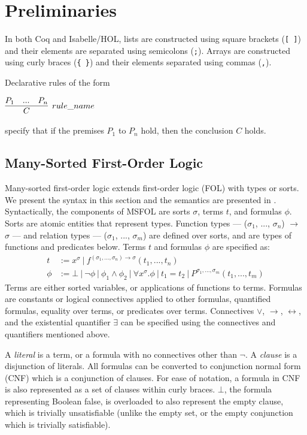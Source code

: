 \documentclass{article}
\begin{document}
	\section{Preliminaries}
	\label{sec:prelims}
	
	In both Coq and Isabelle/HOL,
	lists are constructed using 
	square brackets (\texttt{[ ]})
	and their elements are separated 
	using semicolons (\texttt{;}). 
	Arrays are constructed using 
	curly braces (\texttt{\{ \}})
	and their elements separated 
	using commas (\texttt{,}).
	
	Declarative rules of the form
	\begin{center}
		$\infer[rule\_name]{C}{P_1 & ... & P_n}$
	\end{center}
	specify that if the premises $P_1$ to 
	$P_n$ hold, then the conclusion $C$
	holds.
	
	\subsection{Many-Sorted First-Order Logic}
	\label{sec:msfol}
	Many-sorted first-order logic extends
	first-order logic (FOL) with 
	types or sorts. We present the 
	syntax in this section and the 
	semantics are presented in
	\cite{Barrett2018}. Syntactically, 
	the components of MSFOL are sorts 
	$\sigma$, terms $t$, and 
	formulas $\phi$. Sorts are 
	atomic entities that 
	represent types. Function types 
	--- ($\sigma_1$, ..., $\sigma_n$) 
	$\to$ $\sigma$ ---
	and relation types 
	--- ($\sigma_1$, ..., $\sigma_m$)
	are defined over sorts, and 
	are types of functions and 
	predicates below. Terms $t$ and 
	formulas $\phi$ are specified as:
	\begin{align*}
	t &:= x^{\sigma}\ |\ 
	f^{(\sigma_1, ..., \sigma_n) \to 
		\sigma}	(t_1, ..., t_n)\\
	\phi &:= \bot\ |\ \neg \phi\ |\ 
	\phi_1 \land \phi_2\ |\ \forall 
	x^{\sigma} . \phi\ |\ t_1 = t_2
	\ |\ P^{\sigma_1,...,\sigma_m}
	(t_1, ..., t_m)
	\end{align*}
	Terms are either sorted variables, 
	or applications of functions to terms.
	Formulas are constants or logical 
	connectives applied to other 
	formulas, quantified formulas, 
	equality over terms, or predicates 
	over terms. Connectives $\lor$, 
	$\to$, $\leftrightarrow$, and the 
	existential	quantifier $\exists$ 
	can be specified using the connectives 
	and quantifiers mentioned above.
	
	A \textit{literal} is a term, or a 
	formula with no connectives other than 
	$\neg$. A \textit{clause} is a 
	disjunction of literals. All formulas 
	can be converted to conjunction normal 
	form (CNF) which is a conjunction of 
	clauses. For ease of notation, 
	a formula in CNF is also represented
	as a set of clauses within curly 
	braces. $\bot$, the formula 
	representing Boolean false, 
	is overloaded to also represent
	the empty clause, which is trivially
	unsatisfiable (unlike the empty set,
	or the empty conjunction which is 
	trivially satisfiable).
	
\end{document}
